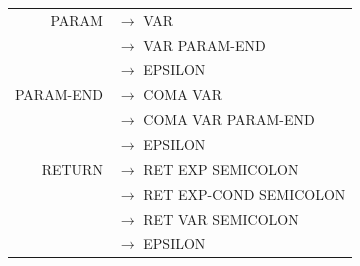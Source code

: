 \documentclass[a4paper,10pt]{article}
\begin{document}
\begin{tabular}{rl}
					
PARAM				& $\rightarrow$ VAR \\
					& $\rightarrow$ VAR PARAM-END\\
					& $\rightarrow$ EPSILON \\
PARAM-END			& $\rightarrow$ COMA VAR \\ 
					& $\rightarrow$ COMA VAR PARAM-END\\ 
					& $\rightarrow$ EPSILON \\

RETURN				& $\rightarrow$ RET EXP SEMICOLON\\
					& $\rightarrow$ RET EXP-COND SEMICOLON\\
					& $\rightarrow$ RET VAR SEMICOLON\\
					& $\rightarrow$ EPSILON \\
					



					
					
\end{tabular}

~\\
\end{document}

